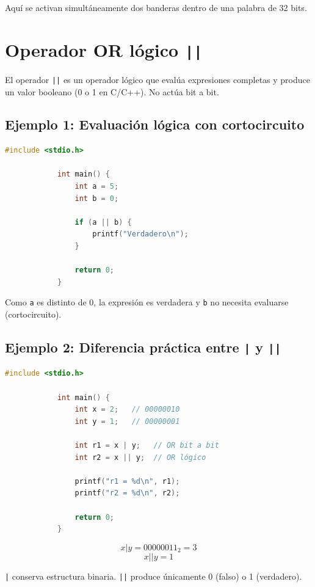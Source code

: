 \documentclass[12pt,twoside]{book}
\begin{document}
		\noindent
		Aquí se activan simultáneamente dos banderas dentro de una palabra de 32 bits.
		
		\section{Operador OR lógico \texttt{||}}
		
		\noindent
		El operador \texttt{||} es un operador lógico que evalúa expresiones completas y produce un valor booleano (0 o 1 en C/C++). No actúa bit a bit.
		
		\subsection{Ejemplo 1: Evaluación lógica con cortocircuito}
		
		\begin{lstlisting}[language=C, caption={Uso de OR lógico en C}]
			#include <stdio.h>
			
			int main() {
				int a = 5;
				int b = 0;
				
				if (a || b) {
					printf("Verdadero\n");
				}
				
				return 0;
			} \end{lstlisting}
		
		\noindent
		Como \texttt{a} es distinto de 0, la expresión es verdadera y \texttt{b} no necesita evaluarse (cortocircuito).
		
		\subsection{Ejemplo 2: Diferencia práctica entre \texttt{|} y \texttt{||}}
		
		\begin{lstlisting}[language=C, caption={Comparación entre OR bit a bit y OR lógico}]
			#include <stdio.h>
			
			int main() {
				int x = 2;   // 00000010
				int y = 1;   // 00000001
				
				int r1 = x | y;   // OR bit a bit
				int r2 = x || y;  // OR lógico
				
				printf("r1 = %d\n", r1);
				printf("r2 = %d\n", r2);
				
				return 0;
			} \end{lstlisting}
		
		\[
		x | y = 00000011_2 = 3
		\]
		\[
		x || y = 1
		\]
		
		\noindent
		\texttt{|} conserva estructura binaria.  
		\texttt{||} produce únicamente 0 (falso) o 1 (verdadero).
		
\end{document}
